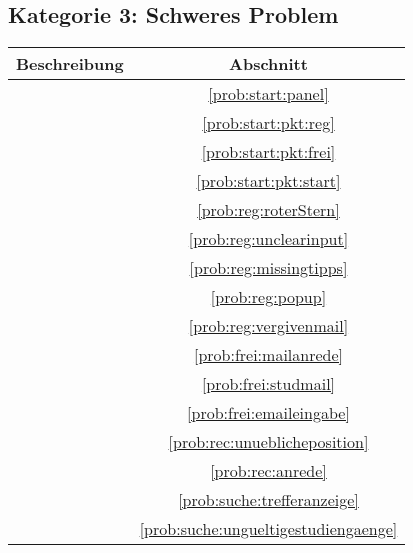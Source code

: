 \subsection*{Kategorie 3: Schweres Problem}
\begin{tabular}{|p{12cm}|c|}
\hline
\textbf{Beschreibung} & \textbf{Abschnitt} \\
\hline\hline
\nameref{prob:start:panel} & \ref{prob:start:panel} \\
\nameref{prob:start:pkt:reg} & \ref{prob:start:pkt:reg}\\
\nameref{prob:start:pkt:frei} & \ref{prob:start:pkt:frei}\\
\nameref{prob:start:pkt:start} & \ref{prob:start:pkt:start}\\
\nameref{prob:reg:roterStern} & \ref{prob:reg:roterStern}\\
\nameref{prob:reg:unclearinput} & \ref{prob:reg:unclearinput}\\
\nameref{prob:reg:missingtipps} & \ref{prob:reg:missingtipps}\\
\nameref{prob:reg:popup} & \ref{prob:reg:popup}\\
\nameref{prob:reg:vergivenmail} & \ref{prob:reg:vergivenmail}\\
\nameref{prob:frei:mailanrede} & \ref{prob:frei:mailanrede}\\
\nameref{prob:frei:studmail} & \ref{prob:frei:studmail}\\
\nameref{prob:frei:emaileingabe} & \ref{prob:frei:emaileingabe}\\
\nameref{prob:rec:unueblicheposition} & \ref{prob:rec:unueblicheposition}\\
\nameref{prob:rec:anrede} & \ref{prob:rec:anrede}\\
\nameref{prob:suche:trefferanzeige} & \ref{prob:suche:trefferanzeige}\\
\nameref{prob:suche:ungueltigestudiengaenge} & \ref{prob:suche:ungueltigestudiengaenge}\\
\hline

\end{tabular}

